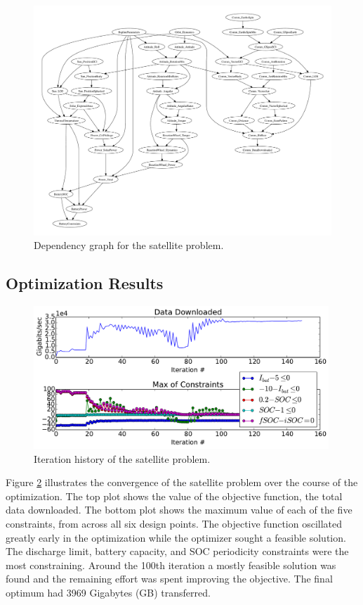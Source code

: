 \documentclass[]{aiaa-tc} %
\begin{document}
    \begin{figure}[!htb]\begin{center}
      \includegraphics[width=.95\textwidth]{images/CADRE.pdf}
      \caption{ Dependency graph for the satellite problem. \label{fig:cadre_graph}}
    \end{center}\end{figure}

    \subsection{Optimization Results}


        \begin{figure}[!htb]
        \centering
        \includegraphics[width=0.99\textwidth]{images/cadre_opt_progress}
        \caption[width=0.22\textwidth]{Iteration history of the satellite problem.
        \label{convergence}
        }
        \end{figure}


        Figure \ref{convergence} illustrates the convergence of the satellite problem over the course of
        the optimization. The top plot shows the value of the objective function, the total data downloaded.
        The bottom plot shows the maximum value of each of the five constraints, from across all six design points.
        The objective function oscillated greatly early in the optimization while the optimizer sought a feasible
        solution. The discharge limit, battery capacity, and SOC periodicity
        constraints were the most constraining. Around the 100th iteration a mostly feasible solution was found and
        the remaining effort was spent improving the objective. The final optimum had 3969 Gigabytes (GB) transferred.
\end{document}
